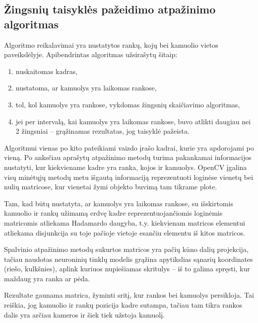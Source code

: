 \documentclass{VUMIFPSbakalaurinis}
\begin{document}
\subsection{Žingsnių taisyklės pažeidimo atpažinimo algoritmas}

Algoritmo reikalavimai yra nustatytos rankų, kojų bei kamuolio vietos paveikslėlyje. Apibendrintas algoritmas užsirašytų šitaip: 

\begin{enumerate}
	\item nuskaitomas kadras,
	\item nustatoma, ar kamuolys yra laikomas rankose,
	\item tol, kol kamuolys yra rankose, vykdomas žingsnių skaičiavimo algoritmas,
	\item jei per intervalą, kai kamuolys yra laikomas rankose, buvo atlikti daugiau nei 2 žingsniai – grąžinamas rezultatas, jog taisyklė pažeista.
\end{enumerate}

Algoritmui vienas po kito pateikiami vaizdo įrašo kadrai, kurie yra apdorojami po vieną. Po anksčiau aprašytų atpažinimo metodų turima pakankamai informacijos nustatyti, kur kiekviename kadre yra ranka, kojos ir kamuolys. OpenCV įgalina visų minėtųjų metodų metu išgautą informaciją reprezentuoti loginėse vienetų bei nulių matricose, kur vienetai žymi objekto buvimą tam tikrame plote. 

Tam, kad būtų nustatyta, ar kamuolys yra laikomas rankose, su išskirtomis kamuolio ir rankų užimamą erdvę kadre reprezentuojančiomis loginėmis matricomis atliekama Hadamardo daugyba, t.y. kiekvienam matricos elementui atliekama disjunkcija su toje pačioje vietoje esančiu elementu iš kitos matricos.

Spalvinio atpažinimo metodų sukurtos matricos yra pačių kūno dalių projekcija, tačiau naudotas neuroninių tinklų modelis grąžina apytikslias sąnarių koordinates (riešo, kulkšnies), aplink kuriuos nupiešiamas skritulys – iš to galima spręsti, kur maždaug yra ranka ar pėda.  

Rezultate gaunama matrica, žyminti sritį, kur rankos bei kamuolys persikloja. Tai reiškia, jog kamuolio ir rankų pozicija kadre sutampa, tačiau tam tikra rankos dalis yra arčiau kameros ir šiek tiek užstoja kamuolį. 
\end{document}
